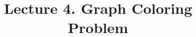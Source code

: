 \documentclass[aspectratio=169]{beamer}
\begin{document}
 

\newcommand{\Cov}{\mathrm{Cov}}
\newcommand{\Var}{\mathrm{Var}}
\newcommand{\brho}{\boldsymbol{\rho}}
\newcommand{\bSigma}{\boldsymbol{\Sigma}}
\newcommand{\btheta}{\boldsymbol{\theta}}
\newcommand{\bbeta}{\boldsymbol{\beta}}
\newcommand{\bmu}{\boldsymbol{\mu}}
\newcommand{\bW}{\mathbf{W}}
\newcommand{\one}{\mathbf{1}}
\newcommand{\bH}{\mathbf{H}}
\newcommand{\by}{\mathbf{y}}
\newcommand{\bolde}{\mathbf{e}}
\newcommand{\bx}{\mathbf{x}}

\newcommand{\cpp}[1]{\texttt{#1}}

\providecommand{\abs}[1]{\lvert#1\rvert}
\providecommand{\norm}[1]{\lVert#1\rVert}
\providecommand{\Blue}[1]{\textcolor{blue}{#1}}
\providecommand{\Red}[1]{\textcolor{red}{#1}}  
\providecommand{\Purple}[1]{\textcolor{purple}{#1}} %
\newcommand{\celsius}{\ensuremath{^\circ}C}
\newcommand\thfore{\mathord{\therefore}\,}

\title{Lecture 4. Graph Coloring Problem}

\date{ }

\frame[plain]{\titlepage}
\end{document}
